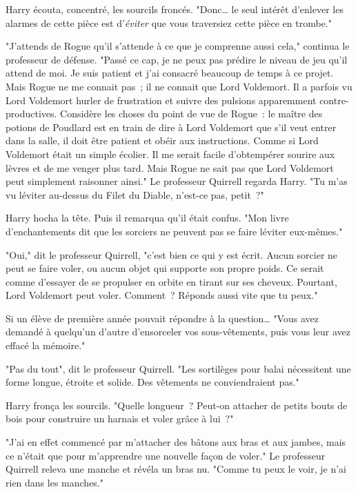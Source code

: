 Harry écouta, concentré, les sourcils froncés. "Donc… le seul intérêt d'enlever les alarmes de cette pièce est d'\emph{éviter} que vous traversiez cette pièce en trombe."

"J'attends de Rogue qu'il s'attende à ce que je comprenne aussi cela," continua le professeur de défense. "Passé ce cap, je ne peux pas prédire le niveau de jeu qu'il attend de moi. Je suis patient et j'ai consacré beaucoup de temps à ce projet. Mais Rogue ne me connait pas~; il ne connait que Lord Voldemort. Il a parfois vu Lord Voldemort hurler de frustration et suivre des pulsions apparemment contre-productives. Considère les choses du point de vue de Rogue~: le maître des potions de Poudlard est en train de dire à Lord Voldemort que s'il veut entrer dans la salle, il doit être patient et obéir aux instructions. Comme si Lord Voldemort était un simple écolier. Il me serait facile d'obtempérer sourire aux lèvres et de me venger plus tard. Mais Rogue ne sait pas que Lord Voldemort peut simplement raisonner ainsi." Le professeur Quirrell regarda Harry. "Tu m'as vu léviter au-dessus du Filet du Diable, n'est-ce pas, petit~?"

Harry hocha la tête. Puis il remarqua qu'il était confus. "Mon livre d'enchantements dit que les sorciers ne peuvent pas se faire léviter eux-mêmes."

"Oui," dit le professeur Quirrell, "c'est bien ce qui y est écrit. Aucun sorcier ne peut se faire voler, ou aucun objet qui supporte son propre poids. Ce serait comme d'essayer de se propulser en orbite en tirant sur ses cheveux. Pourtant, Lord Voldemort peut voler. Comment~? Réponds aussi vite que tu peux."

Si un élève de première année pouvait répondre à la question… "Vous avez demandé à quelqu'un d'autre d'ensorceler vos sous-vêtements, puis vous leur avez effacé la mémoire."

"Pas du tout", dit le professeur Quirrell. "Les sortilèges pour balai nécessitent une forme longue, étroite et solide. Des vêtements ne conviendraient pas."

Harry fronça les sourcils. "Quelle longueur~? Peut-on attacher de petits bouts de bois pour construire un harnais et voler grâce à lui~?"

"J'ai en effet commencé par m'attacher des bâtons aux bras et aux jambes, mais ce n'était que pour m'apprendre une nouvelle façon de voler." Le professeur Quirrell releva une manche et révéla un bras nu. "Comme tu peux le voir, je n'ai rien dans les manches."

